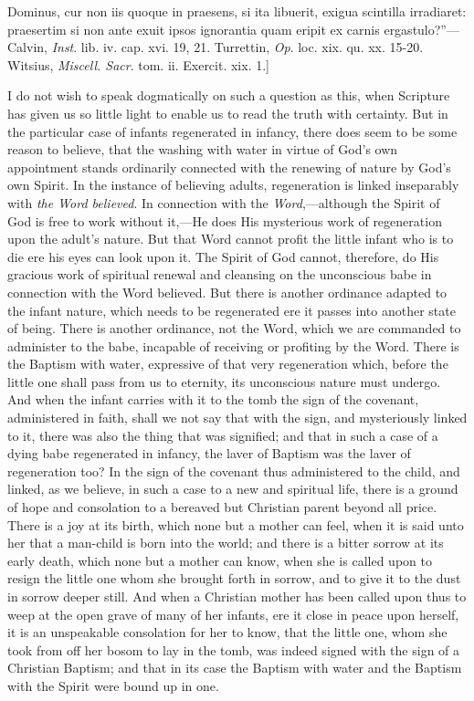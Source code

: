 \documentclass[english,]{book}
\begin{document}
{Dominus, cur non iis quoque in praesens, si ita libuerit, exigua scintilla irradiaret: praesertim si non ante exuit ipsos ignorantia quam eripit ex carnis ergastulo?''---Calvin, \emph{Inst}. lib. iv. cap. xvi. 19, 21. Turrettin, \emph{Op}. loc. xix. qu. xx. 15-20. Witsius, \emph{Miscell. Sacr}. tom. ii. Exercit. xix. 1.{]}}

I do not wish to speak dogmatically on such a question as this, when Scripture has given us so little light to enable us to read the truth with certainty. But in the particular case of infants regenerated in infancy, there does seem to be some reason to believe, that the washing with water in virtue of God's own appointment stands ordinarily connected with the renewing of nature by God's own Spirit. In the instance of believing adults, regeneration is linked inseparably with \emph{the Word believed}. In connection with the \emph{Word},---although the Spirit of God is free to work without it,---He does His mysterious work of regeneration upon the adult's nature. But that Word cannot profit the little infant who is to die ere his eyes can look upon it. The Spirit of God cannot, therefore, do His gracious work of spiritual renewal and cleansing on the unconscious babe in connection with the Word believed. But there is another ordinance adapted to the infant nature, which needs to be regenerated ere it passes into another state of being. There is another ordinance, not the Word, which we are commanded to administer to the babe, incapable of receiving or profiting by the Word. There is the Baptism with water, expressive of that very regeneration which, before the little one shall pass from us to eternity, its unconscious nature must undergo. And when the infant carries with it to the tomb the sign of the covenant, administered in faith, shall we not say that with the sign, and mysteriously linked to it, there was also the thing that was signified; and that in such a case of a dying babe regenerated in infancy, the laver of Baptism was the laver of regeneration too? In the sign of the covenant thus administered to the child, and linked, as we believe, in such a case to a new and spiritual life, there is a ground of hope and consolation to a bereaved but Christian parent beyond all price. There is a joy at its birth, which none but a mother can feel, when it is said unto her that a man-child is born into the world; and there is a bitter sorrow at its early death, which none but a mother can know, when she is called upon to resign the little one whom she brought forth in sorrow, and to give it to the dust in sorrow deeper still. And when a Christian mother has been called upon thus to weep at the open grave of many of her infants, ere it close in peace upon herself, it is an unspeakable consolation for her to know, that the little one, whom she took from off her bosom to lay in the tomb, was indeed signed with the sign of a Christian Baptism; and that in its case the Baptism with water and the Baptism with the Spirit were bound up in one.
\end{document}
